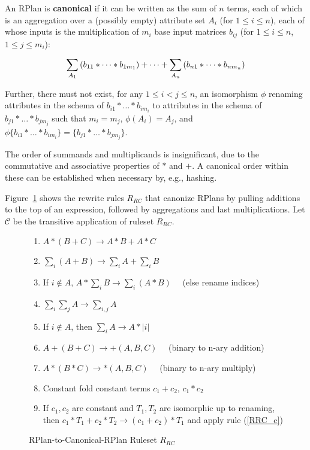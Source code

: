 \begin{definition}
An RPlan is \textbf{canonical} if it can be written as the sum of $n$ terms, each of which is an aggregation over a (possibly empty) attribute set $A_i$ (for $1 \leq i \leq n$), each of whose inputs is the multiplication of $m_i$ base input matrices $b_{ij}$ (for $1 \leq i \leq n$, $1 \leq j \leq m_i$):

\[\sum_{A_1} \lrparen{b_{11} * \dots * b_{1m_1}} %
+ \dots + \sum_{A_n} \lrparen{b_{n1} * \dots * b_{nm_n}}\]

Further, there must not exist, for any $1 \leq i < j \leq n$, an isomorphism $\phi$ renaming attributes in the schema of $b_{i1} * \dots * b_{im_i}$ to attributes in the schema of $b_{j1} * \dots * b_{jm_j}$ such that $m_i=m_j$, $\phi(A_i) = A_j$, and $\phi\{b_{i1} * \dots * b_{im_i}\} = \{b_{j1} * \dots * b_{jm_j}\}$.

The order of summands and multiplicands is insignificant, due to the commutative and associative properties of $*$ and $+$. A canonical order within these can be established when necessary by, e.g., hashing.

\end{definition}

Figure~\ref{RRC} shows the rewrite rules $R_{RC}$ that canonize RPlans by pulling additions to the top of an expression, followed by aggregations and last multiplications. 
Let $\mathcal{C}$ be the transitive application of ruleset $R_{RC}$.

\begin{figure}[htb]
\begin{enumerate}
  \item\label{RRC_mp} $A * (B + C) \rightarrow A*B + A*C$
  \item\label{RRC_ap} $\sum_i (A + B) \rightarrow \sum_i A + \sum_i B$
  \item\label{RRC_ma} If $i \not\in A$,  $A * \sum_i B \rightarrow \sum_i (A * B) \quad$ (else rename indices)
  \item\label{RRC_aa} $\sum_i \sum_j A \rightarrow \sum_{i,j} A$
  \item\label{RRC_ac} If $i \not\in A$, then $\sum_i A \rightarrow A * |i|$
  \item\label{RRC_pp} $A + (B + C) \rightarrow +(A, B, C) \quad$ (binary to n-ary addition)
  \item\label{RRC_mm} $A * (B * C) \rightarrow *(A, B, C) \quad$ (binary to n-ary multiply)
  \item\label{RRC_c} Constant fold constant terms $c_1 + c_2$, $c_1*c_2$
  \item\label{RRC_cc} 
  If $c_1, c_2$ are constant and $T_1, T_2$ are isomorphic up to renaming,
  then $c_1 * T_1 + c_2 * T_2 \to (c_1 + c_2) * T_1$ and apply rule (\ref{RRC_c})
\end{enumerate}
\caption{RPlan-to-Canonical-RPlan Ruleset $R_{RC}$}
\label{RRC}
\end{figure}

